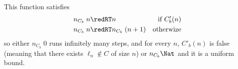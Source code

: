\begin{remark}\label{rmk:termin_FT}
  This function satisfies
  \begin{align*}
    n_{C_b}\;n &\redRT n &\text{if } C'_b(n)\\
    n_{C_b}\;n &\redRT n_{C_b}\;(n+1) &\text{otherwize}
  \end{align*}
  so either $n_{C_b}\;0$ runs infinitely many steps, and for every $n$, $C'_b(n)$ is false (meaning that there exists $\ell_n \notin C$ of size $n$) or $n_{C_b} \real \Nat$ and it is a uniform bound.
\end{remark}

%
%
%
%
%
%

